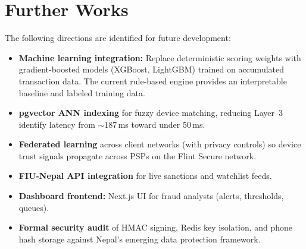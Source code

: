 \section{Further Works}

The following directions are identified for future development:
\begin{itemize}
  \item \textbf{Machine learning integration:} Replace deterministic scoring weights with
        gradient-boosted models (XGBoost, LightGBM) trained on accumulated transaction data.
        The current rule-based engine provides an interpretable baseline and labeled training data.
  \item \textbf{pgvector ANN indexing} for fuzzy device matching, reducing Layer~3 identify
        latency from $\sim$187\,ms toward under 50\,ms.
  \item \textbf{Federated learning} across client networks (with privacy controls) so device
        trust signals propagate across PSPs on the Flint Secure network.
  \item \textbf{FIU-Nepal API integration} for live sanctions and watchlist feeds.
  \item \textbf{Dashboard frontend:} Next.js UI for fraud analysts (alerts, thresholds, queues).
  \item \textbf{Formal security audit} of HMAC signing, Redis key isolation, and phone hash
        storage against Nepal's emerging data protection framework.
\end{itemize}
